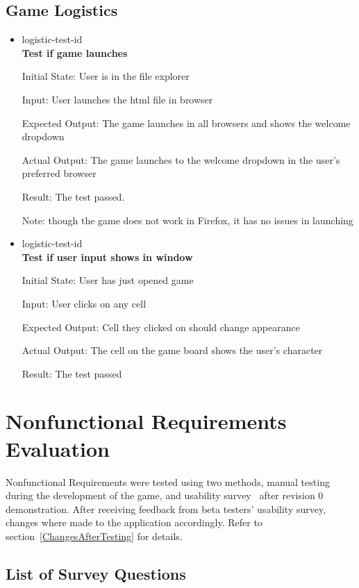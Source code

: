 \documentclass[12pt, titlepage]{article}
\newcounter{GLnum}
\newcommand{\ttheGLnum}{logistic-test-id \theGLnum}
\begin{document}
\subsection{Game Logistics}

\begin{itemize}

\item {\ttheGLnum \label{GLtest1}\\}
\textbf{Test if game launches}
					
Initial State: User is in the file explorer
					
Input: User launches the html file in browser
					
Expected Output: The game launches in all browsers and shows the welcome dropdown

Actual Output: The game launches to the welcome dropdown in the user's preferred browser

Result: The test passed. 

Note: though the game does not work in Firefox, it has no issues in launching

\item {\ttheGLnum \label{GLtest2}\\}
\textbf{Test if user input shows in window}
					
Initial State: User has just opened game
					
Input: User clicks on any cell
					
Expected Output: Cell they clicked on should change appearance

Actual Output: The cell on the game board shows the user's character

Result: The test passed

\end{itemize}

\section{Nonfunctional Requirements Evaluation}
Nonfunctional Requirements were tested using two methods, manual testing during the 
development of the game, and usability survey~\citep{survey} after revision 0 demonstration. After receiving feedback from beta testers' usability survey, changes where made to the application accordingly. Refer to section~\ref{ChangesAfterTesting} for details.

\subsection* {List of Survey Questions}
\end{document}
